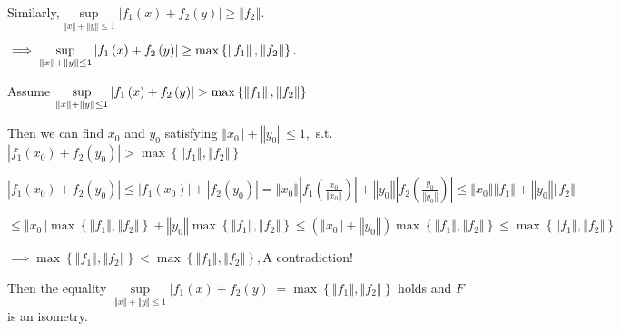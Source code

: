 \documentclass{article}
\begin{document}
Similarly,$\underset{\left\Vert x\right\Vert +\left\Vert y\right\Vert \leq 1}%
{\sup }\left\vert f_{1}\left( x\right) +f_{2}\left( y\right) \right\vert
\geq \left\Vert f_{2}\right\Vert .$

$\implies \underset{\left\Vert x\right\Vert +\left\Vert y\right\Vert \leq 1}{%
\sup }\left\vert f_{1}\left( x\right) +f_{2}\left( y\right) \right\vert \geq
\max \left\{ \left\Vert f_{1}\right\Vert ,\left\Vert f_{2}\right\Vert
\right\} .$

Assume $\underset{\left\Vert x\right\Vert +\left\Vert y\right\Vert \leq 1}{%
\sup }\left\vert f_{1}\left( x\right) +f_{2}\left( y\right) \right\vert
>\max \left\{ \left\Vert f_{1}\right\Vert ,\left\Vert f_{2}\right\Vert
\right\} $

Then we can find $x_{0}$ and $y_{0}$ satisfying $\left\Vert x_{0}\right\Vert
+\left\Vert y_{0}\right\Vert \leq 1,$ s.t. $\left\vert f_{1}\left(
x_{0}\right) +f_{2}\left( y_{0}\right) \right\vert >\max \left\{ \left\Vert
f_{1}\right\Vert ,\left\Vert f_{2}\right\Vert \right\} $

$\left\vert f_{1}\left( x_{0}\right) +f_{2}\left( y_{0}\right) \right\vert
\leq \left\vert f_{1}\left( x_{0}\right) \right\vert +\left\vert f_{2}\left(
y_{0}\right) \right\vert =\left\Vert x_{0}\right\Vert \left\vert f_{1}\left( 
\frac{x_{0}}{\left\Vert x_{0}\right\Vert }\right) \right\vert +\left\Vert
y_{0}\right\Vert \left\vert f_{2}\left( \frac{y_{0}}{\left\Vert
y_{0}\right\Vert }\right) \right\vert \leq \left\Vert x_{0}\right\Vert
\left\Vert f_{1}\right\Vert +\left\Vert y_{0}\right\Vert \left\Vert
f_{2}\right\Vert $

$\leq \left\Vert x_{0}\right\Vert \max \left\{ \left\Vert f_{1}\right\Vert
,\left\Vert f_{2}\right\Vert \right\} +\left\Vert y_{0}\right\Vert \max
\left\{ \left\Vert f_{1}\right\Vert ,\left\Vert f_{2}\right\Vert \right\}
\leq \left( \left\Vert x_{0}\right\Vert +\left\Vert y_{0}\right\Vert \right)
\max \left\{ \left\Vert f_{1}\right\Vert ,\left\Vert f_{2}\right\Vert
\right\} \leq \max \left\{ \left\Vert f_{1}\right\Vert ,\left\Vert
f_{2}\right\Vert \right\} $

$\implies \max \left\{ \left\Vert f_{1}\right\Vert ,\left\Vert
f_{2}\right\Vert \right\} <\max \left\{ \left\Vert f_{1}\right\Vert
,\left\Vert f_{2}\right\Vert \right\} ,$A contradiction!

Then the equality $\underset{\left\Vert x\right\Vert +\left\Vert
y\right\Vert \leq 1}{\sup }\left\vert f_{1}\left( x\right) +f_{2}\left(
y\right) \right\vert =\max \left\{ \left\Vert f_{1}\right\Vert ,\left\Vert
f_{2}\right\Vert \right\} $ holds and $F$ is an isometry.
\end{document}
